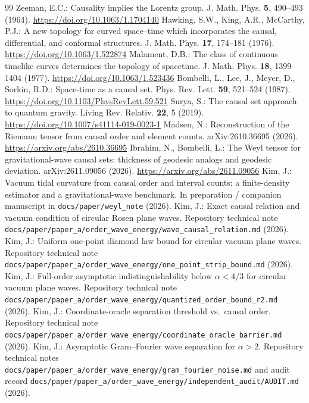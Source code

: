 \documentclass[11pt,a4paper]{article}
\newcommand{\doi}[1]{\url{https://doi.org/#1}}
\begin{document}
\begin{thebibliography}{99}\small
{} Zeeman, E.C.: Causality implies the Lorentz group. J. Math. Phys. \textbf{5}, 490--493 (1964). \doi{10.1063/1.1704140}
 Hawking, S.W., King, A.R., McCarthy, P.J.: A new topology for curved space--time which incorporates the causal, differential, and conformal structures. J. Math. Phys. \textbf{17}, 174--181 (1976). \doi{10.1063/1.522874}
 Malament, D.B.: The class of continuous timelike curves determines the topology of spacetime. J. Math. Phys. \textbf{18}, 1399--1404 (1977). \doi{10.1063/1.523436}
 Bombelli, L., Lee, J., Meyer, D., Sorkin, R.D.: Space-time as a causal set. Phys. Rev. Lett. \textbf{59}, 521--524 (1987). \doi{10.1103/PhysRevLett.59.521}
 Surya, S.: The causal set approach to quantum gravity. Living Rev. Relativ. \textbf{22}, 5 (2019). \doi{10.1007/s41114-019-0023-1}
 Madsen, N.: Reconstruction of the Riemann tensor from causal order and element counts. arXiv:2610.36695 (2026). \url{https://arxiv.org/abs/2610.36695}
 Ibrahim, N., Bombelli, L.: The Weyl tensor for gravitational-wave causal sets: thickness of geodesic analogs and geodesic deviation. arXiv:2611.09056 (2026). \url{https://arxiv.org/abs/2611.09056}
 Kim, J.: Vacuum tidal curvature from causal order and interval counts: a finite-density estimator and a gravitational-wave benchmark. In preparation / companion manuscript in \nolinkurl{docs/paper/weyl_note} (2026).
 Kim, J.: Exact causal relation and vacuum condition of circular Rosen plane waves. Repository technical note \nolinkurl{docs/paper/paper_a/order_wave_energy/wave_causal_relation.md} (2026).
 Kim, J.: Uniform one-point diamond law bound for circular vacuum plane waves. Repository technical note \nolinkurl{docs/paper/paper_a/order_wave_energy/one_point_strip_bound.md} (2026).
 Kim, J.: Full-order asymptotic indistinguishability below $\alpha < 4/3$ for circular vacuum plane waves. Repository technical note \nolinkurl{docs/paper/paper_a/order_wave_energy/quantized_order_bound_r2.md} (2026).
 Kim, J.: Coordinate-oracle separation threshold vs.\ causal order. Repository technical note \nolinkurl{docs/paper/paper_a/order_wave_energy/coordinate_oracle_barrier.md} (2026).
 Kim, J.: Asymptotic Gram--Fourier wave separation for $\alpha > 2$. Repository technical notes \nolinkurl{docs/paper/paper_a/order_wave_energy/gram_fourier_noise.md} and audit record \nolinkurl{docs/paper/paper_a/order_wave_energy/independent_audit/AUDIT.md} (2026).
\end{thebibliography}
\end{document}
